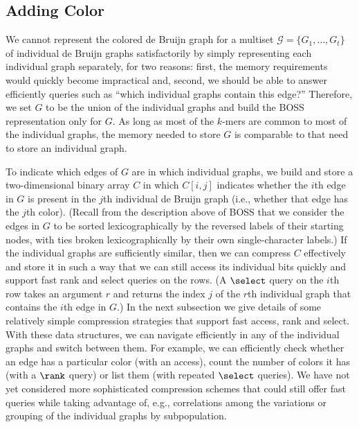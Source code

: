 \subsection{Adding Color}
\label{subsec:color}

We cannot represent the colored de Bruijn graph for a multiset \(\mathcal{G} = \{G_1, \ldots, G_t\}\) of individual de Bruijn graphs satisfactorily by simply representing each individual graph separately, for two reasons: first, the memory requirements would quickly become impractical and, second, we should be able to answer efficiently queries such as ``which individual graphs contain this edge?''  Therefore, we set $G$ to be the union of the individual graphs and build the BOSS representation only for $G$.  As long as most of the $k$-mers are common to most of the individual graphs, the memory needed to store $G$ is comparable to that need to store an individual graph.

To indicate which edges of $G$ are in which individual graphs, we build and store a two-dimensional binary array $C$ in which \(C [i, j]\) indicates whether the $i$th edge in $G$ is present in the $j$th individual de Bruijn graph (i.e., whether that edge has the $j$th color). 
(Recall from the description above of BOSS that we consider the edges in $G$ to be sorted lexicographically by the reversed labels of their starting nodes, with ties broken lexicographically by their own single-character labels.) 
If the individual graphs are sufficiently similar, then we can compress $C$ effectively and store it in such a way that we can still access its individual bits quickly and support fast rank and select queries on the rows.  (A $\select$ query on the $i$th row takes an argument $r$ and returns the index $j$ of the $r$th individual graph that contains the $i$th edge in $G$.)  In the next subsection we give details of some relatively simple compression strategies that support fast access, rank and select.  With these data structures, we can navigate efficiently in any of the individual graphs and switch between them.  For example, we can efficiently check whether an edge has a particular color (with an access), count the number of colors it has (with a $\rank$ query) or list them (with repeated $\select$ queries).  We have not yet considered more sophisticated compression schemes that could still offer fast queries while taking advantage of, e.g., correlations among the variations or grouping of the individual graphs by subpopulation.

